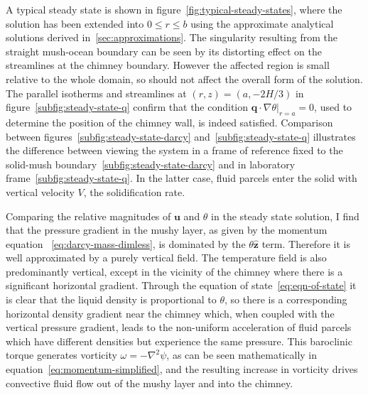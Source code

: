 \documentclass[11pt]{proc}
\makeatletter
\newcommand{\specialeqref}[2]{\begingroup
  \def\tagform@##1{\maketag@@@{(\ignorespaces##1\unskip\@@italiccorr#2)}}%
  \eqref{#1}\endgroup}
\makeatother
\begin{document}
A typical steady state is shown in figure~\ref{fig:typical-steady-states}, where the solution has been extended into $0 \le r \le b$ using the approximate analytical solutions derived in~\autoref{sec:approximations}. The singularity resulting from the straight mush-ocean boundary can be seen by its distorting effect on the streamlines at the chimney boundary. However the affected region is small relative to the whole domain, so should not affect the overall form of the solution. The parallel isotherms and streamlines at $(r, z) = (a, -2H/3)$ in figure~\ref{subfig:steady-state-q} confirm that the condition $\left. \mathbf{q} \cdot \nabla \theta \right|_{r=a} = 0$, used to determine the position of the chimney wall, is indeed satisfied. Comparison between figures~\ref{subfig:steady-state-darcy} and~\ref{subfig:steady-state-q} illustrates the difference between viewing the system in a frame of reference fixed to the solid-mush boundary~\ref{subfig:steady-state-darcy} and in laboratory frame~\ref{subfig:steady-state-q}. In the latter case, fluid parcels enter the solid with vertical velocity $V$, the solidification rate.

Comparing the relative magnitudes of $\mathbf{u}$ and $\theta$ in the steady state solution, I find that the pressure gradient in the mushy layer, as given by the momentum equation~\specialeqref{eq:darcy-mass-dimless}{a}, is dominated by the $\theta \mathbf{\hat{z}}$ term. Therefore it is well approximated by a purely vertical field. The temperature field is also predominantly vertical, except in the vicinity of the chimney where there is a significant horizontal gradient. Through the equation of state~\eqref{eq:eqn-of-state} it is clear that the liquid density is proportional to $\theta$, so there is a corresponding horizontal density gradient near the chimney which, when coupled with the vertical pressure gradient, leads to the non-uniform acceleration of fluid parcels which have different densities but experience the same pressure. This baroclinic torque generates vorticity $\omega = - \nabla^2 \psi$, as can be seen mathematically in equation~\eqref{eq:momentum-simplified}, and the resulting increase in vorticity drives convective fluid flow out of the mushy layer and into the chimney.
\end{document}
